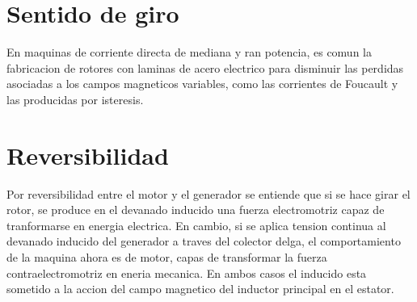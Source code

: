 \documentclass[12pt,a4paper]{report}
\begin{document}
\section{Sentido de giro}
En maquinas de corriente directa de mediana y ran potencia, es comun la fabricacion de rotores con laminas de acero electrico para disminuir las perdidas asociadas a los campos magneticos variables, como las corrientes de Foucault y las producidas por isteresis.
\section{Reversibilidad}
Por reversibilidad entre el motor y el generador se entiende que si se hace girar el rotor, se produce en el devanado inducido una fuerza electromotriz capaz de tranformarse en energia electrica. En cambio, si se aplica tension continua al devanado inducido del generador a traves del colector delga, el comportamiento de la maquina ahora es de motor, capas de transformar la fuerza contraelectromotriz en eneria mecanica. En ambos casos el inducido esta sometido a la accion del campo magnetico del inductor principal en el estator.
\end{document}
